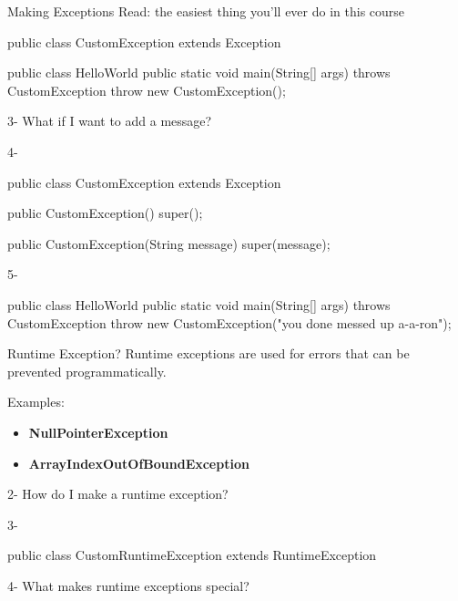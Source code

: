 \documentclass[week4]{csse2002}
\begin{document}
\begin{topic}{Making Exceptions}
{\small Read: the easiest thing you'll ever do in this course}

\begin{java}
public class CustomException extends Exception {}
\end{java}

\begin{subtopic}{2}
\begin{java}
public class HelloWorld {
	public static void main(String[] args) throws CustomException {
		throw new CustomException();
	}
}
\end{java}
\end{subtopic}

\begin{subtopic}{3-}
What if I want to add a message?
\end{subtopic}

\begin{subtopic}{4-}
\begin{java}
public class CustomException extends Exception {
	public CustomException() {
		super();
	}

	public CustomException(String message) {
		super(message);
	}
}
\end{java}
\end{subtopic}

\begin{subtopic}{5-}
\begin{java}
public class HelloWorld {
	public static void main(String[] args) throws CustomException {
		throw new CustomException("you done messed up a-a-ron");
	}
}
\end{java}
\end{subtopic}
\end{topic}

\begin{topic}{Runtime Exception?}
Runtime exceptions are used for errors that can be prevented
programmatically.

Examples: 
\begin{itemize}
	\item \textbf{NullPointerException}
	\item \textbf{ArrayIndexOutOfBoundException}
\end{itemize}

\begin{subtopic}{2-}
How do I make a runtime exception?
\end{subtopic}

\begin{subtopic}{3-}
\begin{java}
public class CustomRuntimeException extends RuntimeException {}
\end{java}
\end{subtopic}

\begin{subtopic}{4-}
What makes runtime exceptions special?
\end{subtopic}
\end{topic}
\end{document}
